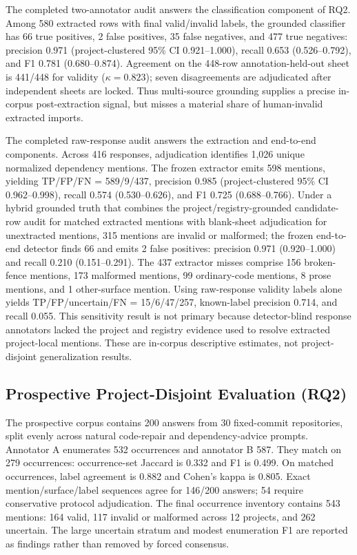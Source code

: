 \documentclass[pdflatex,sn-basic]{sn-jnl}
\begin{document}
The completed two-annotator audit answers the classification component of RQ2. Among 580 extracted rows with final valid/invalid labels, the grounded classifier has 66 true positives, 2 false positives, 35 false negatives, and 477 true negatives: precision 0.971 (project-clustered 95\% CI 0.921--1.000), recall 0.653 (0.526--0.792), and F1 0.781 (0.680--0.874). Agreement on the 448-row annotation-held-out sheet is 441/448 for validity (\(\kappa=0.823\)); seven disagreements are adjudicated after independent sheets are locked. Thus multi-source grounding supplies a precise in-corpus post-extraction signal, but misses a material share of human-invalid extracted imports.

The completed raw-response audit answers the extraction and end-to-end components. Across 416 responses, adjudication identifies 1,026 unique normalized dependency mentions. The frozen extractor emits 598 mentions, yielding TP/FP/FN = 589/9/437, precision 0.985 (project-clustered 95\% CI 0.962--0.998), recall 0.574 (0.530--0.626), and F1 0.725 (0.688--0.766). Under a hybrid grounded truth that combines the project/registry-grounded candidate-row audit for matched extracted mentions with blank-sheet adjudication for unextracted mentions, 315 mentions are invalid or malformed; the frozen end-to-end detector finds 66 and emits 2 false positives: precision 0.971 (0.920--1.000) and recall 0.210 (0.151--0.291). The 437 extractor misses comprise 156 broken-fence mentions, 173 malformed mentions, 99 ordinary-code mentions, 8 prose mentions, and 1 other-surface mention. Using raw-response validity labels alone yields TP/FP/uncertain/FN = 15/6/47/257, known-label precision 0.714, and recall 0.055. This sensitivity result is not primary because detector-blind response annotators lacked the project and registry evidence used to resolve extracted project-local mentions. These are in-corpus descriptive estimates, not project-disjoint generalization results.

\subsection{Prospective Project-Disjoint Evaluation (RQ2)}

The prospective corpus contains 200 answers from 30 fixed-commit repositories, split evenly across natural code-repair and dependency-advice prompts. Annotator A enumerates 532 occurrences and annotator B 587. They match on 279 occurrences: occurrence-set Jaccard is 0.332 and F1 is 0.499. On matched occurrences, label agreement is 0.882 and Cohen's kappa is 0.805. Exact mention/surface/label sequences agree for 146/200 answers; 54 require conservative protocol adjudication. The final occurrence inventory contains 543 mentions: 164 valid, 117 invalid or malformed across 12 projects, and 262 uncertain. The large uncertain stratum and modest enumeration F1 are reported as findings rather than removed by forced consensus.
\end{document}
